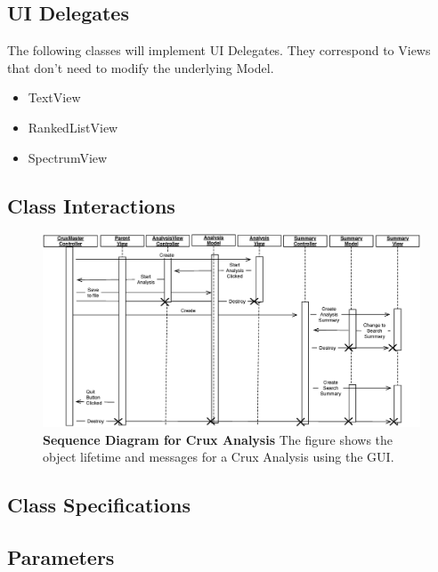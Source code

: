 \documentclass{article}
\begin{document}
\subsection{UI Delegates}

The following classes will implement UI Delegates. They correspond to Views
that don't need to modify the underlying Model.

\begin{itemize}
\item TextView 
\item RankedListView
\item SpectrumView
\end{itemize}

\subsection{Class Interactions}

\begin{figure}[h]
\centering
\includegraphics[width=6in]{crux-gui-sequence.eps}
\caption{{\bf Sequence Diagram for Crux Analysis}  The figure shows the 
object lifetime and messages for a Crux Analysis using the GUI.
  \label{figure:sequence}}
\end{figure}

\subsection{Class Specifications}

\subsection{Parameters}
\end{document}
